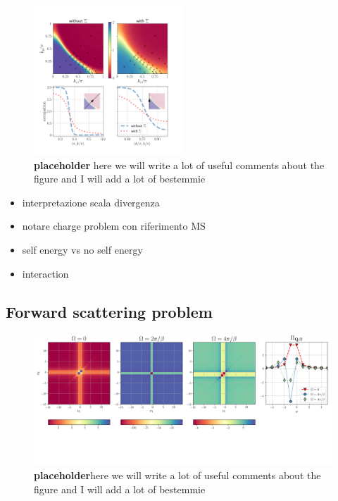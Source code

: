 \begin{figure}
\includegraphics[width=0.5\textwidth]{images/occupations_0600.png}
\caption{\textbf{placeholder} here we will write a lot of useful comments about the figure and I will add a lot of bestemmie} 
\label{fig:occupation}
\end{figure}





\begin{itemize}
\item interpretazione scala divergenza
\item notare charge problem con riferimento MS 
\item self energy vs no self energy
\item interaction  
\end{itemize}   


\subsection{Forward scattering problem}

\begin{figure}
\includegraphics[width=\textwidth]{images/PL_all.png}
\vspace*{-2.0cm}
\caption{\textbf{placeholder}here we will write a lot of useful comments about the figure and I will add a lot of bestemmie} 
\label{fig:perpladder}
\end{figure}


